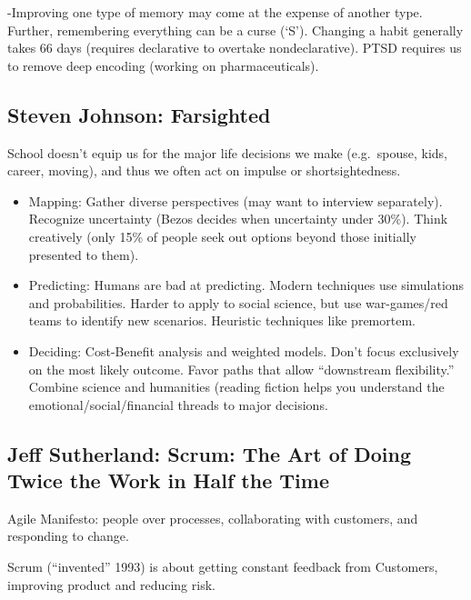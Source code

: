 \documentclass[
]{article}
\begin{document}
-Improving one type of memory may come at the expense of another type.
Further, remembering everything can be a curse (`S'). Changing a habit
generally takes 66 days (requires declarative to overtake
nondeclarative). PTSD requires us to remove deep encoding (working on
pharmaceuticals).

\hypertarget{steven-johnson-farsighted}{%
\subsection{Steven Johnson:
Farsighted}\label{steven-johnson-farsighted}}

School doesn't equip us for the major life decisions we make
(e.g.~spouse, kids, career, moving), and thus we often act on impulse or
shortsightedness.

\begin{itemize}
\item
  Mapping: Gather diverse perspectives (may want to interview
  separately). Recognize uncertainty (Bezos decides when uncertainty
  under 30\%). Think creatively (only 15\% of people seek out options
  beyond those initially presented to them).
\item
  Predicting: Humans are bad at predicting. Modern techniques use
  simulations and probabilities. Harder to apply to social science, but
  use war-games/red teams to identify new scenarios. Heuristic
  techniques like premortem.
\item
  Deciding: Cost-Benefit analysis and weighted models. Don't focus
  exclusively on the most likely outcome. Favor paths that allow
  ``downstream flexibility.'' Combine science and humanities (reading
  fiction helps you understand the emotional/social/financial threads to
  major decisions.
\end{itemize}

\hypertarget{jeff-sutherland-scrum-the-art-of-doing-twice-the-work-in-half-the-time}{%
\subsection{Jeff Sutherland: Scrum: The Art of Doing Twice the Work in
Half the
Time}\label{jeff-sutherland-scrum-the-art-of-doing-twice-the-work-in-half-the-time}}

Agile Manifesto: people over processes, collaborating with customers,
and responding to change.

Scrum (``invented'' 1993) is about getting constant feedback from
Customers, improving product and reducing risk.
\end{document}
